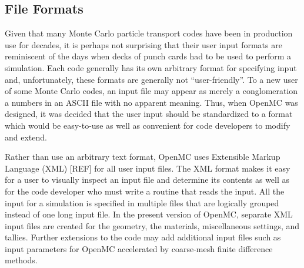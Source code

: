 \documentclass{elsarticle}
\begin{document}
\subsection{File Formats}

Given that many Monte Carlo particle transport codes have been in production use
for decades, it is perhaps not surprising that their user input formats are
reminiscent of the days when decks of punch cards had to be used to perform a
simulation. Each code generally has its own arbitrary format for specifying
input and, unfortunately, these formats are generally not ``user-friendly''. To
a new user of some Monte Carlo codes, an input file may appear as merely a
conglomeration a numbers in an ASCII file with no apparent meaning. Thus, when
OpenMC was designed, it was decided that the user input should be standardized
to a format which would be easy-to-use as well as convenient for code developers
to modify and extend.

Rather than use an arbitrary text format, OpenMC uses Extensible Markup Language
(XML) [REF] for all user input files. The XML format makes it easy for a user to
visually inspect an input file and determine its contents as well as for the
code developer who must write a routine that reads the input. All the input for
a simulation is specified in multiple files that are logically grouped instead
of one long input file. In the present version of OpenMC, separate XML input
files are created for the geometry, the materials, miscellaneous settings, and
tallies. Further extensions to the code may add additional input files such as
input parameters for OpenMC accelerated by coarse-mesh finite difference
methods.
\end{document}

